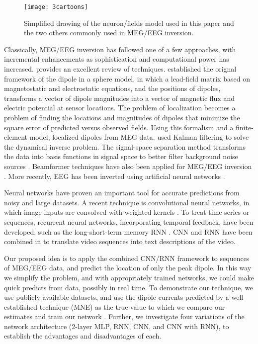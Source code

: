 \documentclass[journal,12pt,onecolumn,draftclsnofoot,]{IEEEtran}
\begin{document}
\begin{figure}[h!]
\centering
\texttt{[image: 3cartoons]}
\caption{Simplified drawing of the neuron/fields model used in this paper and the two others commonly used in MEG/EEG inversion.}
\label{fig:cartoon}
\end{figure}

Classically, MEG/EEG inversion has followed one of a few approaches, with incremental enhancements as sophistication and computational power has increased. \cite{grech2008review} provides an excellent review of techniques. \cite{mosher1992multiple} established the orignal framework of the dipole in a sphere model, in which a lead-field matrix based on magnetostatic and electrostatic equations, and the positions of dipoles, transforms a vector of dipole magnitudes into a vector of magnetic flux and electric potential at sensor locations. The problem of localization becomes a problem of finding the locations and magnitudes of dipoles that minimize the square error of predicted versus observed fields. Using this formalism and a finite-element model, \cite{buchner1997inverse} localized dipoles from MEG data. \cite{galka2004solution} used Kalman filtering to solve the dynamical inverse problem. The signal-space separation method transforms the data into basis functions in signal space to better filter background noise sources \cite{taulu2005applications}. Beamformer techniques have also been applied for MEG/EEG inversion \cite{sekihara2001reconstructing}. More recently, EEG has been inverted using artificial neural networks \cite{van2000eeg}.


Neural networks have proven an important tool for accurate predictions from noisy and large datasets. A recent technique is convolutional neural networks, in which image inputs are convolved with weighted kernels \cite{lecun1998gradient}. To treat time-series or sequences, recurrent neural networks, incorporating temporal feedback, have been developed, such as the long-short-term memory RNN \cite{hochreiter1997long}. CNN and RNN have been combined in \cite{venugopalan2014translating} to translate video sequences into text descriptions of the video.


Our proposed idea is to apply the combined CNN/RNN framework to sequences of MEG/EEG data, and predict the location of only the peak dipole. In this way we simplify the problem, and with appropriately trained networks, we could make quick predicts from data, possibly in real time. To demonstrate our technique, we use publicly available datasets, and use the dipole currents predicted by a well established technique (MNE) as the true value to which we compare our estimates and train our network \cite{gramfort2014mne}. Further, we investigate four variations of the network architecture (2-layer MLP, RNN, CNN, and CNN with RNN), to establish the advantages and disadvantages of each.
\end{document}
